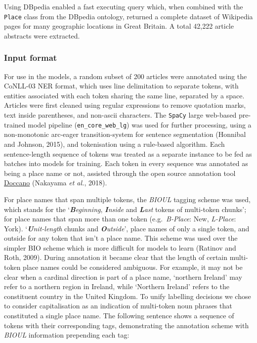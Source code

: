 \documentclass[
  letterpaper,
  11pt,
  english,
  onehalfspacing,
  headsepline]{MastersDoctoralThesis}
\begin{document}
Using DBpedia enabled a fast executing query which, when combined with
the \texttt{Place} class from the DBpedia ontology, returned a complete
dataset of Wikipedia pages for many geographic locations in Great
Britain. A total 42,222 article abstracts were extracted.

\hypertarget{input-format}{%
\subsubsection{Input format}\label{input-format}}

For use in the models, a random subset of 200 articles were annotated
using the CoNLL-03 NER format, which uses line delimitation to separate
tokens, with entities associated with each token sharing the same line,
separated by a space. Articles were first cleaned using regular
expressions to remove quotation marks, text inside parentheses, and
non-ascii characters. The \texttt{SpaCy} large web-based pre-trained
model pipeline (\texttt{en\_core\_web\_lg}) was used for further
processing, using a non-monotonic arc-eager transition-system for
sentence segmentation (Honnibal and Johnson, 2015), and tokenisation
using a rule-based algorithm. Each sentence-length sequence of tokens
was treated as a separate instance to be fed as batches into models for
training. Each token in every sequence was annotated as being a place
name or not, assisted through the open source annotation tool
\href{https://github.com/doccano/doccano}{Doccano} (Nakayama \emph{et
al.}, 2018).

For place names that span multiple tokens, the \emph{BIOUL} tagging
scheme was used, which stands for the `\emph{\textbf{B}eginning},
\emph{\textbf{I}nside} and \emph{\textbf{L}ast} tokens of multi-token
chunks'; for place names that span more than one token
(e.g.~\emph{B-Place}: New, \emph{L-Place}: York).
`\emph{\textbf{U}nit-length} chunks and \emph{\textbf{O}utside}', place
names of only a single token, and outside for any token that isn't a
place name. This scheme was used over the simpler BIO scheme which is
more difficult for models to learn (Ratinov and Roth, 2009). During
annotation it became clear that the length of certain multi-token place
names could be considered ambiguous. For example, it may not be clear
when a cardinal direction is part of a place name, `northern Ireland'
may refer to a northern region in Ireland, while `Northern Ireland'
refers to the constituent country in the United Kingdom. To unify
labelling decisions we chose to consider capitalisation as an indication
of multi-token noun phrases that constituted a single place name. The
following sentence shows a sequence of tokens with their corresponding
tags, demonstrating the annotation scheme with \emph{BIOUL} information
prepending each tag:
\end{document}
